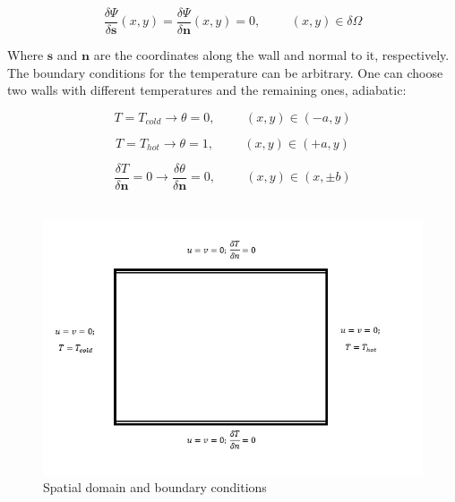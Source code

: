 \begin{equation}
\frac{\delta \Psi}{\delta \mathbf{s}} (x,y)= \frac{\delta \Psi}{\delta
\mathbf{n}} (x,y)=0, \hspace{1cm} (x,y)\in \delta \Omega
\end{equation}

Where $\mathbf{s}$ and $\mathbf{n}$ are the coordinates along the wall and
normal to it, respectively.\\

The boundary conditions for the temperature can be arbitrary. One can choose
two walls with different temperatures and the remaining ones, adiabatic:

\begin{equation}
T=T_{cold} \rightarrow \theta=0, \hspace{1cm}
(x,y)\in(-a,y)
\end{equation}

\begin{equation}
T=T_{hot} \rightarrow \theta=1, \hspace{1cm}
(x,y)\in(+a,y)
\end{equation}

\begin{equation}
\frac{\delta T}{\delta \mathbf{n}}=0 \rightarrow \frac{\delta \theta}{\delta
\mathbf{n}}=0, \hspace{1cm} (x,y)\in(x,\pm b)
\end{equation}\\ 

\begin{figure}[h]
\centering
\includegraphics[scale=0.8, trim = 5mm 10mm 0mm 10mm,
clip]{./Figures/4-IVBP/figure_1.jpg}
\caption{Spatial domain and boundary conditions}
\label{BC_figure}
\end{figure}


